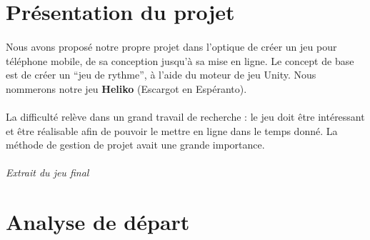 \section{Présentation du projet}

\paragraph{}
Nous avons proposé notre propre projet dans l’optique de créer un jeu pour téléphone mobile, de sa conception jusqu’à sa mise en ligne. Le concept de base est de créer un “jeu de rythme”, à l'aide du moteur de jeu Unity. Nous nommerons notre jeu \textbf{Heliko} (Escargot en Espéranto).

\paragraph{}
La difficulté relève dans un grand travail de recherche : le jeu doit être intéressant et être réalisable afin de pouvoir le mettre en ligne dans le temps donné. La méthode de gestion de projet avait une grande importance.

\paragraph{}
\noindent
{}
\begin{center}
\textit{Extrait du jeu final}
\end{center}

\section{Analyse de départ}

